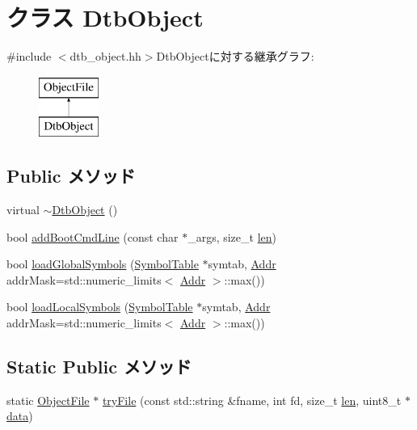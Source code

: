 \hypertarget{classDtbObject}{
\section{クラス DtbObject}
\label{classDtbObject}
}


{\ttfamily \#include $<$dtb\_\-object.hh$>$}DtbObjectに対する継承グラフ:\begin{figure}[H]
\begin{center}
\leavevmode
\includegraphics[height=2cm]{classDtbObject}
\end{center}
\end{figure}
\subsection*{Public メソッド}
\begin{DoxyCompactItemize}
\item 
virtual \hyperlink{classDtbObject_a46a1bb2e6ec09d7b37530e94b2529452}{$\sim$DtbObject} ()
\item 
bool \hyperlink{classDtbObject_a3d1578c362819bbd3af37cbbfeb6732e}{addBootCmdLine} (const char $\ast$\_\-args, size\_\-t \hyperlink{classObjectFile_a7360b55975153b822efc5217b7734e6a}{len})
\item 
bool \hyperlink{classDtbObject_a1de102f86bbb53d20455d9e78be53935}{loadGlobalSymbols} (\hyperlink{classSymbolTable}{SymbolTable} $\ast$symtab, \hyperlink{base_2types_8hh_af1bb03d6a4ee096394a6749f0a169232}{Addr} addrMask=std::numeric\_\-limits$<$ \hyperlink{base_2types_8hh_af1bb03d6a4ee096394a6749f0a169232}{Addr} $>$::max())
\item 
bool \hyperlink{classDtbObject_aab9393b89c15838ac1b842e642f981bb}{loadLocalSymbols} (\hyperlink{classSymbolTable}{SymbolTable} $\ast$symtab, \hyperlink{base_2types_8hh_af1bb03d6a4ee096394a6749f0a169232}{Addr} addrMask=std::numeric\_\-limits$<$ \hyperlink{base_2types_8hh_af1bb03d6a4ee096394a6749f0a169232}{Addr} $>$::max())
\end{DoxyCompactItemize}
\subsection*{Static Public メソッド}
\begin{DoxyCompactItemize}
\item 
static \hyperlink{classObjectFile}{ObjectFile} $\ast$ \hyperlink{classDtbObject_a3b119de4852833fdf74dbb4b8e1e1eba}{tryFile} (const std::string \&fname, int fd, size\_\-t \hyperlink{classObjectFile_a7360b55975153b822efc5217b7734e6a}{len}, uint8\_\-t $\ast$\hyperlink{classObjectFile_abbae3bd152e2d64768026e03593e64f3}{data})
\end{DoxyCompactItemize}
